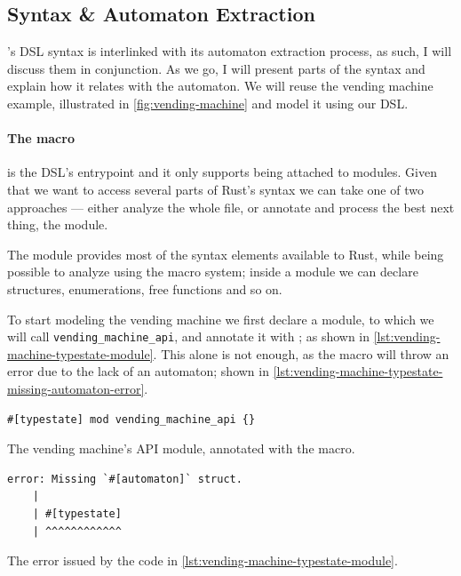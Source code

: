 \subsection{Syntax \& Automaton Extraction}\label{sec:macro-dsl:syntax}

's DSL syntax is interlinked with its automaton extraction process,
as such, I will discuss them in conjunction.
As we go, I will present parts of the syntax and explain how it relates with the automaton.
We will reuse the vending machine example, illustrated in \autoref{fig:vending-machine} and model it using our DSL.

\paragraph{The  macro} is the DSL's entrypoint and it only supports being attached to modules.
Given that we want to access several parts of Rust's syntax  we can take one of two approaches ---
either analyze the whole file, or annotate and process the best next thing, the module.

The module provides most of the syntax elements available to  Rust,
while being possible to analyze using the macro system;
inside a module we can declare structures, enumerations, free functions and so on.

To start modeling the vending machine we first declare a module, to which we will call \texttt{vending\_machine\_api},
and annotate it with ; as shown in \autoref{lst:vending-machine-typestate-module}.
This alone is not enough, as the macro will throw an error due to the lack of an automaton; shown in \autoref{lst:vending-machine-typestate-missing-automaton-error}.

\begin{listing}
    \begin{verbatim}
#[typestate] mod vending_machine_api {}
    \end{verbatim}
    \caption{The vending machine's \gls{API} module, annotated with the  macro.}
    \label{lst:vending-machine-typestate-module}
\end{listing}

\begin{listing}
    \begin{verbatim}
error: Missing `#[automaton]` struct.
    |
    | #[typestate]
    | ^^^^^^^^^^^^
    \end{verbatim}
    \caption{The error issued by the code in \autoref{lst:vending-machine-typestate-module}.}
    \label{lst:vending-machine-typestate-missing-automaton-error}
\end{listing}

